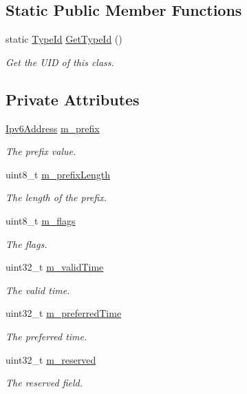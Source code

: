 \subsection*{Static Public Member Functions}
\begin{DoxyCompactItemize}
\item 
static \hyperlink{classns3_1_1TypeId}{Type\+Id} \hyperlink{classns3_1_1Icmpv6OptionPrefixInformation_aede0b1778d3abf666e291f0faaa2509f}{Get\+Type\+Id} ()
\begin{DoxyCompactList}\small\item\em Get the U\+ID of this class. \end{DoxyCompactList}\end{DoxyCompactItemize}
\subsection*{Private Attributes}
\begin{DoxyCompactItemize}
\item 
\hyperlink{classns3_1_1Ipv6Address}{Ipv6\+Address} \hyperlink{classns3_1_1Icmpv6OptionPrefixInformation_aa04a446097bd5e7a962b039e4c8d0281}{m\+\_\+prefix}
\begin{DoxyCompactList}\small\item\em The prefix value. \end{DoxyCompactList}\item 
uint8\+\_\+t \hyperlink{classns3_1_1Icmpv6OptionPrefixInformation_a0a7f67964c445223a66ca05449a36c25}{m\+\_\+prefix\+Length}
\begin{DoxyCompactList}\small\item\em The length of the prefix. \end{DoxyCompactList}\item 
uint8\+\_\+t \hyperlink{classns3_1_1Icmpv6OptionPrefixInformation_abbba72775acc55e3f1adde8eac656ab8}{m\+\_\+flags}
\begin{DoxyCompactList}\small\item\em The flags. \end{DoxyCompactList}\item 
uint32\+\_\+t \hyperlink{classns3_1_1Icmpv6OptionPrefixInformation_aeab78dc7d079caed452d29296eec13b1}{m\+\_\+valid\+Time}
\begin{DoxyCompactList}\small\item\em The valid time. \end{DoxyCompactList}\item 
uint32\+\_\+t \hyperlink{classns3_1_1Icmpv6OptionPrefixInformation_acd4218e19b72951f74a7b99c5fccc1f4}{m\+\_\+preferred\+Time}
\begin{DoxyCompactList}\small\item\em The preferred time. \end{DoxyCompactList}\item 
uint32\+\_\+t \hyperlink{classns3_1_1Icmpv6OptionPrefixInformation_aa5a26beacbe5af38e7dec11b02971643}{m\+\_\+reserved}
\begin{DoxyCompactList}\small\item\em The reserved field. \end{DoxyCompactList}\end{DoxyCompactItemize}
